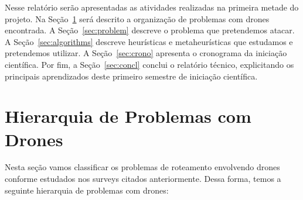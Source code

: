 \documentclass[12pt, a4paper]{article}
\begin{document}
Nesse relatório serão apresentadas as atividades realizadas na primeira metade do projeto. Na Seção~\ref{sec:hier} será descrito a organização de problemas com drones encontrada. A Seção~\ref{sec:problem} descreve o problema que pretendemos atacar. A Seção~\ref{sec:algorithms} descreve heurísticas e metaheurísticas que estudamos e pretendemos utilizar. A Seção~\ref{sec:crono} apresenta o cronograma da iniciação científica. Por fim, a Seção~\ref{sec:concl} conclui o relatório técnico, explicitando os principais aprendizados deste primeiro semestre de iniciação científica.\par



\section{Hierarquia de Problemas com Drones}\label{sec:hier}

Nesta seção vamos classificar os problemas de roteamento envolvendo drones conforme estudados nos surveys citados anteriormente. Dessa forma, temos a seguinte hierarquia de problemas com drones:
\end{document}
